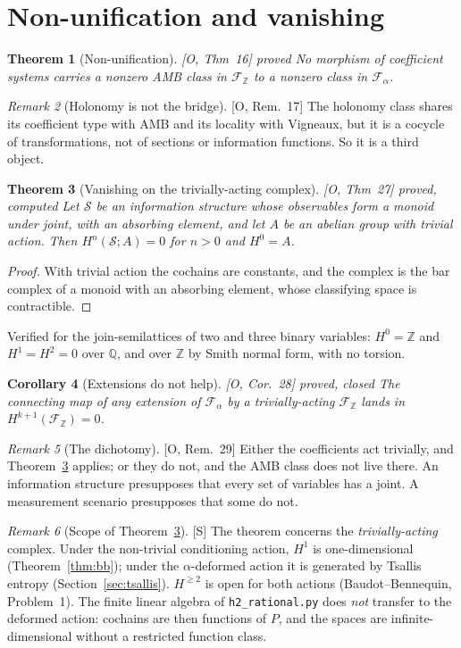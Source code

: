 \documentclass[11pt]{article}
\newtheorem{theorem}{Theorem}[section]
\newtheorem{corollary}[theorem]{Corollary}
\theoremstyle{definition}
\theoremstyle{remark}
\newtheorem{remark}[theorem]{Remark}
\newcommand{\Z}{\mathbb{Z}}
\newcommand{\Q}{\mathbb{Q}}
\newcommand{\src}[1]{\textsf{\small[#1]}}
\newcommand{\st}[1]{\textsf{\small\color{gray}#1}}
\begin{document}
\section{Non-unification and vanishing}
\begin{theorem}[Non-unification]\label{thm:nonunif}
\src{O, Thm~16} \st{proved}
No morphism of coefficient systems carries a nonzero AMB class in $\mathcal F_\Z$ to a nonzero class in $\mathcal F_\alpha$.
\end{theorem}
\begin{remark}[Holonomy is not the bridge]\src{O, Rem.~17} The holonomy class shares its coefficient type with AMB and its locality with Vigneaux, but it is a cocycle of transformations, not of sections or information functions. So it is a third object.\end{remark}
\begin{theorem}[Vanishing on the trivially-acting complex]\label{thm:vanish}
\src{O, Thm~27} \st{proved, computed}
Let $\mathcal S$ be an information structure whose observables form a monoid under joint, with an absorbing element, and let $A$ be an abelian group with trivial action. Then $H^n(\mathcal S;A)=0$ for $n>0$ and $H^0=A$.
\end{theorem}
\begin{proof}
With trivial action the cochains are constants, and the complex is the bar complex of a monoid with an absorbing element, whose classifying space is contractible.
\end{proof}
\noindent Verified for the join-semilattices of two and three binary variables: $H^0=\Z$ and $H^1=H^2=0$ over $\Q$, and over $\Z$ by Smith normal form, with no torsion.
\begin{corollary}[Extensions do not help]\label{res:auto8}\src{O, Cor.~28} \st{proved, closed}
The connecting map of any extension of $\mathcal F_\alpha$ by a trivially-acting $\mathcal F_\Z$ lands in $H^{k+1}(\mathcal F_\Z)=0$.
\end{corollary}
\begin{remark}[The dichotomy]\src{O, Rem.~29}
Either the coefficients act trivially, and Theorem~\ref{thm:vanish} applies; or they do not, and the AMB class does not live there. An information structure presupposes that every set of variables has a joint. A measurement scenario presupposes that some do not.
\end{remark}
\begin{remark}[Scope of Theorem~\ref{thm:vanish}]\src{S}
The theorem concerns the \emph{trivially-acting} complex. Under the non-trivial conditioning action, $H^1$ is one-dimensional (Theorem~\ref{thm:bb}); under the $\alpha$-deformed action it is generated by Tsallis entropy (Section~\ref{sec:tsallis}). $H^{\ge2}$ is open for both actions (Baudot--Bennequin, Problem~1). The finite linear algebra of \texttt{h2\_rational.py} does \emph{not} transfer to the deformed action: cochains are then functions of $P$, and the spaces are infinite-dimensional without a restricted function class.
\end{remark}
\end{document}
